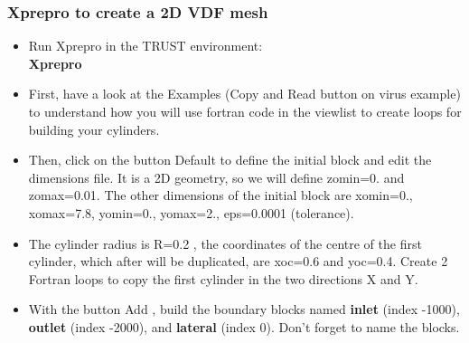 \documentclass[10pt]{beamer}
\begin{document}
\begin{frame}
\frametitle{Xprepro to create a 2D VDF mesh}
\begin{block}{}

\begin{itemize}
\item Run Xprepro in the TRUST environment:\\
\textbf{Xprepro}

\item First, have a look at the Examples (Copy and Read button on virus example) to understand how you will use fortran code in the viewlist to create loops for building your cylinders.

\item Then, click on the button Default to define the initial block and edit the dimensions file. It is a 2D geometry, so we will define zomin=0. and zomax=0.01. The other dimensions of the initial block are xomin=0., xomax=7.8, yomin=0., yomax=2., eps=0.0001 (tolerance).

\item The cylinder radius is R=0.2 , the coordinates of the centre of the first cylinder, which after will be duplicated, are xoc=0.6 and yoc=0.4. Create 2 Fortran loops to copy the first cylinder in the two directions X and Y.

\item With the button Add , build the boundary blocks named \textbf{inlet} (index -1000), \textbf{outlet} (index -2000), and \textbf{lateral} (index 0). Don't forget to name the blocks.
\end{itemize}

\end{block}
\end{frame}
\end{document}
